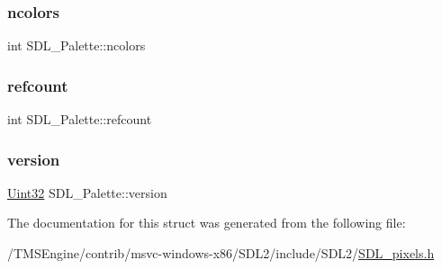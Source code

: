 \subsubsection{\texorpdfstring{ncolors}{ncolors}}
{\footnotesize\ttfamily int S\+D\+L\+\_\+\+Palette\+::ncolors}

\mbox{\label{struct_s_d_l___palette_a35c667737f883f973bb0a8dea143b08d}} 
\subsubsection{\texorpdfstring{refcount}{refcount}}
{\footnotesize\ttfamily int S\+D\+L\+\_\+\+Palette\+::refcount}

\mbox{\label{struct_s_d_l___palette_a5b8d45519f6850a32f13f1602ce37a8e}} 
\subsubsection{\texorpdfstring{version}{version}}
{\footnotesize\ttfamily \hyperlink{_s_d_l__stdinc_8h_add440eff171ea5f55cb00c4a9ab8672d}{Uint32} S\+D\+L\+\_\+\+Palette\+::version}



The documentation for this struct was generated from the following file\+:\begin{DoxyCompactItemize}
\item 
/\+T\+M\+S\+Engine/contrib/msvc-\/windows-\/x86/\+S\+D\+L2/include/\+S\+D\+L2/\hyperlink{_s_d_l__pixels_8h}{S\+D\+L\+\_\+pixels.\+h}\end{DoxyCompactItemize}
